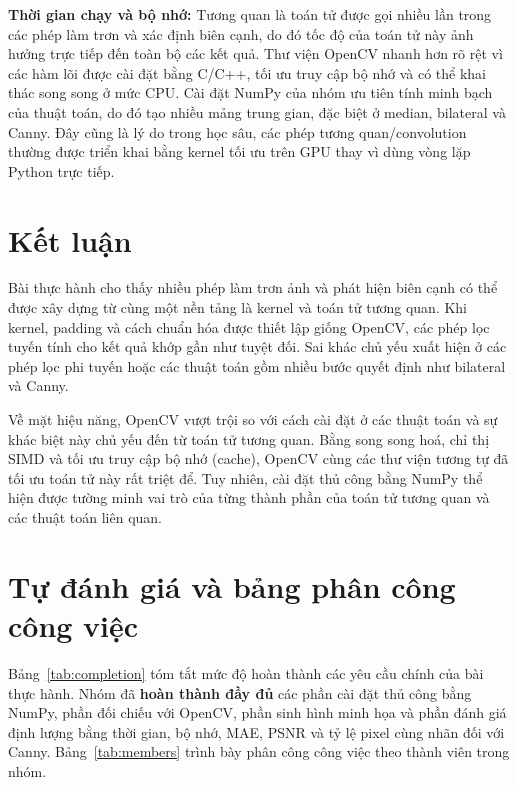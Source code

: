 \documentclass[12pt]{article}
\newcommand{\runin}[1]{\par\medskip\noindent\textbf{#1}\hspace{0.4em}\ignorespaces}
\numberwithin{equation}{section}
\begin{document}
\runin{Thời gian chạy và bộ nhớ:} Tương quan là toán tử được gọi nhiều lần trong
các phép làm trơn và xác định biên cạnh, do đó tốc độ của toán tử
này ảnh hưởng trực tiếp đến toàn bộ các kết quả. Thư viện OpenCV nhanh hơn rõ rệt vì các hàm
lõi được cài đặt bằng C/C++, tối ưu truy cập bộ nhớ và có thể khai thác song
song ở mức CPU. Cài đặt NumPy của nhóm ưu tiên tính minh bạch của thuật toán, do
đó tạo nhiều mảng trung gian, đặc biệt ở median, bilateral và Canny. Đây cũng là
lý do trong học sâu, các phép tương quan/convolution thường được triển khai bằng
kernel tối ưu trên GPU thay vì dùng vòng lặp Python trực tiếp.

\section{Kết luận}

Bài thực hành cho thấy nhiều phép làm trơn ảnh và phát hiện biên cạnh có thể
được xây dựng từ cùng một nền tảng là kernel và toán tử tương quan. Khi kernel,
padding và cách chuẩn hóa được thiết lập giống OpenCV, các phép lọc tuyến tính
cho kết quả khớp gần như tuyệt đối. Sai khác chủ yếu xuất hiện ở các phép lọc
phi tuyến hoặc các thuật toán gồm nhiều bước quyết định như bilateral và Canny.

Về mặt hiệu năng, OpenCV vượt trội so với cách cài đặt ở các thuật toán và sự khác biệt này chủ yếu đến từ toán tử tương quan. Bằng song song hoá, chỉ thị SIMD và tối ưu truy cập bộ nhớ (cache), OpenCV cùng các thư viện tương tự đã tối ưu toán tử này rất triệt để. Tuy nhiên, cài đặt thủ công bằng NumPy thể hiện được tường minh vai trò của từng thành phần của toán tử tương quan và các thuật toán liên quan.

\section{Tự đánh giá và bảng phân công công việc}

Bảng~\ref{tab:completion} tóm tắt mức độ hoàn thành các yêu cầu chính của bài
thực hành. Nhóm đã \textbf{hoàn thành đầy đủ} các phần cài đặt thủ công bằng NumPy, phần đối chiếu với OpenCV, phần sinh hình minh họa và phần đánh giá định lượng bằng
thời gian, bộ nhớ, MAE, PSNR và tỷ lệ pixel cùng nhãn đối với Canny.
Bảng~\ref{tab:members} trình bày phân công công việc theo thành viên trong nhóm.
\end{document}
